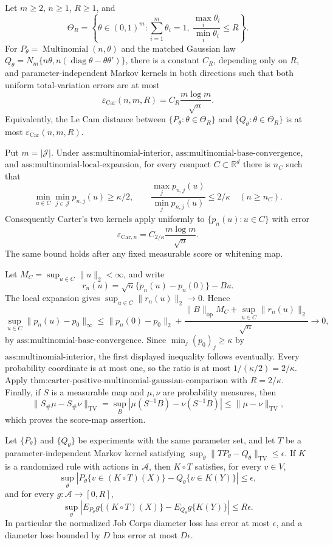 Let \(m\ge 2\), \(n\ge 1\), \(R\ge 1\), and
\[
 \Theta_R=\left\{\theta\in(0,1)^m:\sum_{i=1}^m\theta_i=1,
 \ \frac{\max_i\theta_i}{\min_i\theta_i}\le R\right\}.
\]
For \(P_\theta=\operatorname{Multinomial}(n,\theta)\) and the matched Gaussian law
\(Q_\theta=N_m\{n\theta,n(\operatorname{diag}\theta-\theta\theta')\}\), there is a constant \(C_R\), depending only on \(R\), and parameter-independent Markov kernels in both directions such that both uniform total-variation errors are at most
\[
 \varepsilon_{\mathrm{Car}}(n,m,R)=C_R\frac{m\log m}{\sqrt n}.
\]
Equivalently, the Le Cam distance between \(\{P_\theta:\theta\in\Theta_R\}\) and \(\{Q_\theta:\theta\in\Theta_R\}\) is at most \(\varepsilon_{\mathrm{Car}}(n,m,R)\).

Put \(m=|\mathcal J|\). Under \(\text{ass:multinomial-interior}\), \(\text{ass:multinomial-base-convergence}\), and \(\text{ass:multinomial-local-expansion}\), for every compact \(C\subset\mathbb R^d\) there is \(n_C\) such that
\[
 \min_{u\in C}\min_{j\in\mathcal J}p_{n,j}(u)\ge \kappa/2,
 \qquad
 \frac{\max_jp_{n,j}(u)}{\min_jp_{n,j}(u)}\le 2/\kappa
 \quad(n\ge n_C).
\]
Consequently Carter's two kernels apply uniformly to \(\{p_n(u):u\in C\}\) with error
\[
 \varepsilon_{\mathrm{Car},n}=C_{2/\kappa}\frac{m\log m}{\sqrt n}.
\]
The same bound holds after any fixed measurable score or whitening map.

Let \(M_C=\sup_{u\in C}\|u\|_2<\infty\), and write
\[
 r_n(u)=\sqrt n\{p_n(u)-p_n(0)\}-Bu.
\]
The local expansion gives \(\sup_{u\in C}\|r_n(u)\|_2\to0\). Hence
\[
 \sup_{u\in C}\|p_n(u)-p_0\|_\infty
 \le \|p_n(0)-p_0\|_2+
 \frac{\|B\|_{\mathrm{op}}M_C+\sup_{u\in C}\|r_n(u)\|_2}{\sqrt n}\longrightarrow0,
\]
by \(\text{ass:multinomial-base-convergence}\). Since \(\min_j(p_0)_j\ge\kappa\) by \(\text{ass:multinomial-interior}\), the first displayed inequality follows eventually. Every probability coordinate is at most one, so the ratio is at most \(1/(\kappa/2)=2/\kappa\). Apply \(\text{thm:carter-positive-multinomial-gaussian-comparison}\) with \(R=2/\kappa\). Finally, if \(S\) is a measurable map and \(\mu,\nu\) are probability measures, then
\[
 \|S_\#\mu-S_\#\nu\|_{\mathrm{TV}}
 =\sup_B|\mu(S^{-1}B)-\nu(S^{-1}B)|
 \le \|\mu-\nu\|_{\mathrm{TV}},
\]
which proves the score-map assertion.

Let \(\{P_\theta\}\) and \(\{Q_\theta\}\) be experiments with the same parameter set, and let \(T\) be a parameter-independent Markov kernel satisfying
\(\sup_\theta\|TP_\theta-Q_\theta\|_{\mathrm{TV}}\le\epsilon\). If \(K\) is a randomized rule with actions in \(\mathcal A\), then \(K\circ T\) satisfies, for every \(v\in V\),
\[
 \sup_\theta\left|P_\theta\{v\in(K\circ T)(X)\}
 -Q_\theta\{v\in K(Y)\}\right|\le\epsilon,
\]
and for every \(g:\mathcal A\to[0,R]\),
\[
 \sup_\theta\left|E_{P_\theta}g\{(K\circ T)(X)\}
 -E_{Q_\theta}g\{K(Y)\}\right|\le R\epsilon.
\]
In particular the normalized Job Corps diameter loss has error at most \(\epsilon\), and a diameter loss bounded by \(D\) has error at most \(D\epsilon\).

